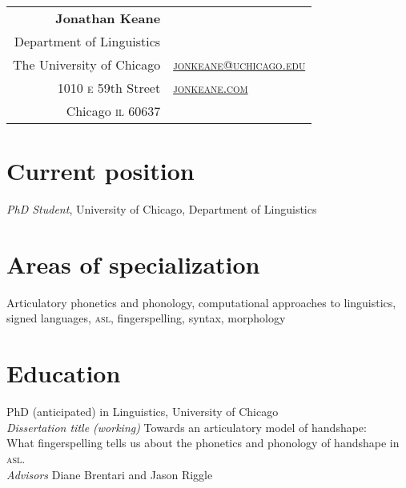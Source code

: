 \documentclass[10pt, letterpaper]{article}
\newcommand{\years}[1]{\marginpar{\scriptsize #1}}
\begin{document}
\thispagestyle{empty} %
\reversemarginpar
\raggedright

\begin{table}[!t]
  \begin{tabular*}{6.5in}{r|l}
    \hspace{3in}\textbf{\LARGE\sffamily Jonathan Keane}  &\\
Department of Linguistics & \\
  The University of Chicago & \href{mailto:jonkeane@uchicago.edu}{\textsc{jonkeane@uchicago.edu}}\\
1010 \textsc{e} 59th Street & \href{http://jonkeane.com}{\textsc{jonkeane.com}}\\
    Chicago \textsc{il} 60637 & \\
  \end{tabular*}
\end{table}
\setlength\parindent{0in}
\setlength\parskip{0ex}
\section*{Current position}
\emph{PhD Student}, University of Chicago, Department of Linguistics\\

\section*{Areas of specialization}
Articulatory phonetics and phonology, computational approaches to linguistics, signed languages, \textsc{asl}, fingerspelling, syntax, morphology


\section*{Education}
\-\years{2014}PhD (anticipated) in Linguistics, University of Chicago \\
\hspace{2em} \textit{Dissertation title (working)} Towards an articulatory model of handshape:\\
\hspace{4em}What fingerspelling tells us about the phonetics and phonology of handshape in \textsc{asl}.\\
\hspace{2em} \textit{Advisors} Diane Brentari and Jason Riggle
\end{document}
